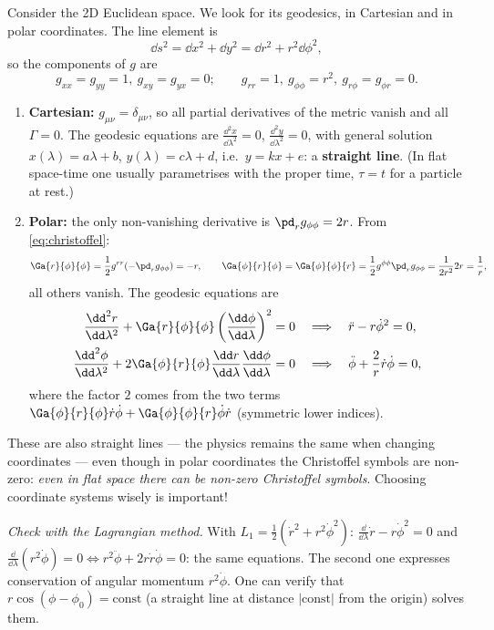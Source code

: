 Consider the 2D Euclidean space. We look for its geodesics, in Cartesian and in polar coordinates. The line element is
\[
  \dd s^2=\dd x^2+\dd y^2=\dd r^2+r^2\dd\phi^2,
\]
so the components of $g$ are
\[
  g_{xx}=g_{yy}=1,\ g_{xy}=g_{yx}=0;\qquad g_{rr}=1,\ g_{\phi\phi}=r^2,\ g_{r\phi}=g_{\phi r}=0 .
\]
\begin{enumerate}[label=(\roman*)]
\item \textbf{Cartesian:} $g_{\mu\nu}=\delta_{\mu\nu}$, so all partial derivatives of the metric vanish and all $\Gamma=0$. The geodesic equations are $\frac{\dd^2x}{\dd\lambda^2}=0$, $\frac{\dd^2y}{\dd\lambda^2}=0$, with general solution $x(\lambda)=a\lambda+b$, $y(\lambda)=c\lambda+d$, i.e.\ $y=kx+e$: a \textbf{straight line}. (In flat space-time one usually parametrises with the proper time, $\tau=t$ for a particle at rest.)
\item \textbf{Polar:} the only non-vanishing derivative is $\pd_r g_{\phi\phi}=2r$. From \eqref{eq:christoffel}:
\[
  \Ga{r}{\phi}{\phi}=\frac12 g^{rr}(-\pd_r g_{\phi\phi})=-r,\qquad
  \Ga{\phi}{r}{\phi}=\Ga{\phi}{\phi}{r}=\frac12 g^{\phi\phi}\pd_r g_{\phi\phi}=\frac{1}{2r^2}2r=\frac1r ,
\]
all others vanish. The geodesic equations are
\begin{align}
  \frac{\dd^2r}{\dd\lambda^2}+\Ga{r}{\phi}{\phi}\left(\frac{\dd\phi}{\dd\lambda}\right)^2=0&\quad\Longrightarrow\quad\ddot r-r\dot\phi^2=0,\\
  \frac{\dd^2\phi}{\dd\lambda^2}+2\Ga{\phi}{r}{\phi}\frac{\dd r}{\dd\lambda}\frac{\dd\phi}{\dd\lambda}=0&\quad\Longrightarrow\quad\ddot\phi+\frac2r\dot r\dot\phi=0,
\end{align}
where the factor $2$ comes from the two terms $\Ga{\phi}{r}{\phi}\dot r\dot\phi+\Ga{\phi}{\phi}{r}\dot\phi\dot r$ (symmetric lower indices).
\end{enumerate}
These are also straight lines --- the physics remains the same when changing coordinates --- even though in polar coordinates the Christoffel symbols are non-zero: \emph{even in flat space there can be non-zero Christoffel symbols}. Choosing coordinate systems wisely is important!

\textit{Check with the Lagrangian method.} With $L_1=\frac12(\dot r^2+r^2\dot\phi^2)$: $\frac{\dd}{\dd\lambda}\dot r-r\dot\phi^2=0$ and $\frac{\dd}{\dd\lambda}(r^2\dot\phi)=0\Leftrightarrow r^2\ddot\phi+2r\dot r\dot\phi=0$: the same equations. The second one expresses conservation of angular momentum $r^2\dot\phi$. One can verify that $r\cos(\phi-\phi_0)=\text{const}$ (a straight line at distance $|\text{const}|$ from the origin) solves them.
